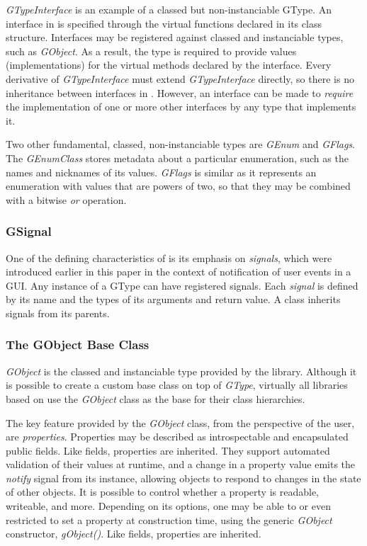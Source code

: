 \documentclass[article]{jss}
\begin{document}
\emph{GTypeInterface} is an example of a classed but non-instanciable GType.
An interface in  is specified through the
virtual functions declared in its class structure. Interfaces may be registered
against classed and instanciable types, such as \emph{GObject}. As a result, the
type is required to provide values (implementations) for the virtual methods 
declared by the interface. Every derivative of \emph{GTypeInterface} must extend
\emph{GTypeInterface} directly, 
so there is no inheritance between interfaces in . However, an 
interface can be made to \emph{require} the implementation of one or more other 
interfaces by any type that implements it.

Two other fundamental, classed, non-instanciable types are \emph{GEnum} and 
\emph{GFlags}. The \emph{GEnumClass} stores metadata about a particular
enumeration, such as the names and nicknames of its values. \emph{GFlags} is
similar as it represents an enumeration with values that are powers of two, 
so that they may be combined with a bitwise \emph{or} operation.

\subsubsection{GSignal}

One of the defining characteristics of  is its emphasis on
\emph{signals}, which were introduced earlier in this paper in the context of
notification of user events in a  GUI. Any instance of a GType can 
have registered signals. Each \emph{signal} is defined by its name and the types
of its arguments and return value. A class inherits signals from its parents.

\subsubsection{The GObject Base Class}

\emph{GObject} is the classed and instanciable type provided by the 
library. Although it is possible to create a custom base class on top of
\emph{GType}, virtually all libraries based on  use the 
\emph{GObject} class as the base for their class hierarchies. 

The key feature provided by the \emph{GObject} class, from the perspective of the 
 user, are \emph{properties}. Properties may be described as 
introspectable and encapsulated public fields. Like fields, properties are 
inherited. They support automated validation 
of their values at runtime, and a change in a property value emits the 
\emph{notify} signal from its instance, allowing objects to respond
to changes in the state of other objects. It is possible to control whether a 
property is readable, writeable, and more. Depending on its options,
one may be able to or even restricted to set a property at construction time, 
using the generic \emph{GObject} constructor, \emph{gObject()}. Like fields, 
properties are inherited.
\end{document}
